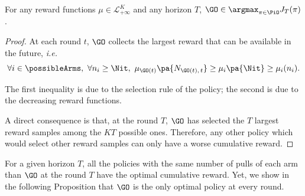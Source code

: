\begin{proposition}
\label{prop:heidari-oracle}
For any reward functions $\mu \in \mathcal{L}_{+\infty}^K$ and any horizon $T$, $\GO \in \argmax_{\pi \in \PiO} J_T(\pi)$.
\end{proposition}%
\begin{proof}

At each round $t$, $\GO$ collects the largest reward that can be available in the future, \textit{i.e.} 
\[
\forall i \in \possibleArms, \ \forall n_i \geq \Nit, \ \mu_{\GO(t)}\pa{N_{\GO(t),\,t}} \geq\mu_{i}\pa{\Nit}  \geq \mu_i(n_i).
\]

The first inequality is due to the selection rule of the policy; the second is due to the decreasing reward functions. 

A direct consequence is that, at the round $T$, $\GO$ has selected the $T$ largest reward samples among the $KT$ possible ones. Therefore, any other policy which would select other reward samples can only have a worse cumulative reward. 
\end{proof}

For a given horizon $T$, all the policies with the same number of pulls of each arm than $\GO$ at the round $T$ have the optimal cumulative reward. Yet, we show in the following Proposition that $\GO$ is the only optimal policy at every round.


